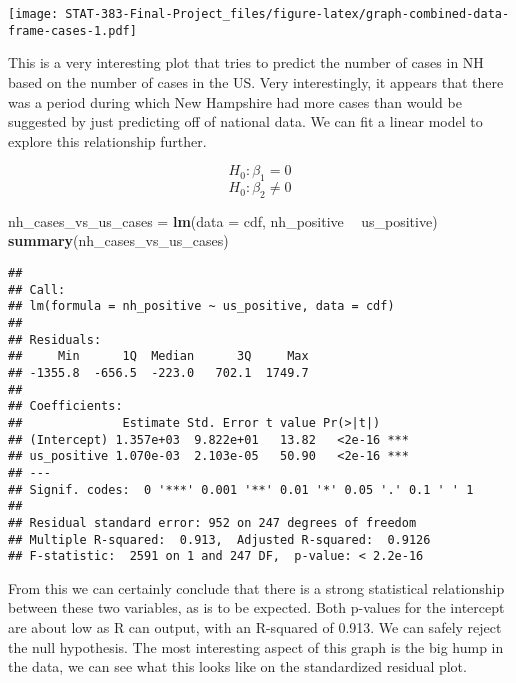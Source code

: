 \documentclass[
]{article}
\newenvironment{Shaded}{\begin{snugshade}}{\end{snugshade}}
\newcommand{\DataTypeTok}[1]{\textcolor[rgb]{0.13,0.29,0.53}{#1}}
\newcommand{\KeywordTok}[1]{\textcolor[rgb]{0.13,0.29,0.53}{\textbf{#1}}}
\newcommand{\NormalTok}[1]{#1}
\newcommand{\OperatorTok}[1]{\textcolor[rgb]{0.81,0.36,0.00}{\textbf{#1}}}
\newcommand{\StringTok}[1]{\textcolor[rgb]{0.31,0.60,0.02}{#1}}
\begin{document}
\texttt{[image: STAT-383-Final-Project\_files/figure-latex/graph-combined-data-frame-cases-1.pdf]}

This is a very interesting plot that tries to predict the number of
cases in NH based on the number of cases in the US. Very interestingly,
it appears that there was a period during which New Hampshire had more
cases than would be suggested by just predicting off of national data.
We can fit a linear model to explore this relationship further.

\[H_{0}: \beta_{1} = 0\] \[H_{0}: \beta_{2} \neq 0\]

\begin{Shaded}
\begin{Highlighting}[]
\NormalTok{nh_cases_vs_us_cases =}\StringTok{ }\KeywordTok{lm}\NormalTok{(}\DataTypeTok{data =}\NormalTok{ cdf, nh_positive }\OperatorTok{~}\StringTok{ }\NormalTok{us_positive)}
\KeywordTok{summary}\NormalTok{(nh_cases_vs_us_cases)}
\end{Highlighting}
\end{Shaded}

\begin{verbatim}
## 
## Call:
## lm(formula = nh_positive ~ us_positive, data = cdf)
## 
## Residuals:
##     Min      1Q  Median      3Q     Max 
## -1355.8  -656.5  -223.0   702.1  1749.7 
## 
## Coefficients:
##              Estimate Std. Error t value Pr(>|t|)    
## (Intercept) 1.357e+03  9.822e+01   13.82   <2e-16 ***
## us_positive 1.070e-03  2.103e-05   50.90   <2e-16 ***
## ---
## Signif. codes:  0 '***' 0.001 '**' 0.01 '*' 0.05 '.' 0.1 ' ' 1
## 
## Residual standard error: 952 on 247 degrees of freedom
## Multiple R-squared:  0.913,  Adjusted R-squared:  0.9126 
## F-statistic:  2591 on 1 and 247 DF,  p-value: < 2.2e-16
\end{verbatim}

From this we can certainly conclude that there is a strong statistical
relationship between these two variables, as is to be expected. Both
p-values for the intercept are about low as R can output, with an
R-squared of 0.913. We can safely reject the null hypothesis. The most
interesting aspect of this graph is the big hump in the data, we can see
what this looks like on the standardized residual plot.
\end{document}
